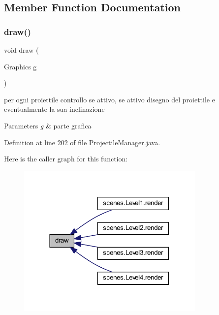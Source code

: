 \subsection{Member Function Documentation}
\mbox{\label{classmanagers_1_1_projectile_manager_a72fe1ffca978e99fd16994a10e7f8051}} 
\subsubsection{\texorpdfstring{draw()}{draw()}}
{\footnotesize\ttfamily void draw (\begin{DoxyParamCaption}\item[{Graphics}]{g }\end{DoxyParamCaption})}



per ogni proiettile controllo se attivo, se attivo disegno del proiettile e eventualmente la sua inclinazione 


\begin{DoxyParams}{Parameters}
{\em g} & parte grafica \\
\hline
\end{DoxyParams}


Definition at line 202 of file Projectile\+Manager.\+java.

Here is the caller graph for this function\+:\nopagebreak
\begin{figure}[H]
\begin{center}
\leavevmode
\includegraphics[width=261pt]{classmanagers_1_1_projectile_manager_a72fe1ffca978e99fd16994a10e7f8051_icgraph}
\end{center}
\end{figure}
\mbox{\label{classmanagers_1_1_projectile_manager_a942d732bac65df2f0d220989ca42ce76}} 
